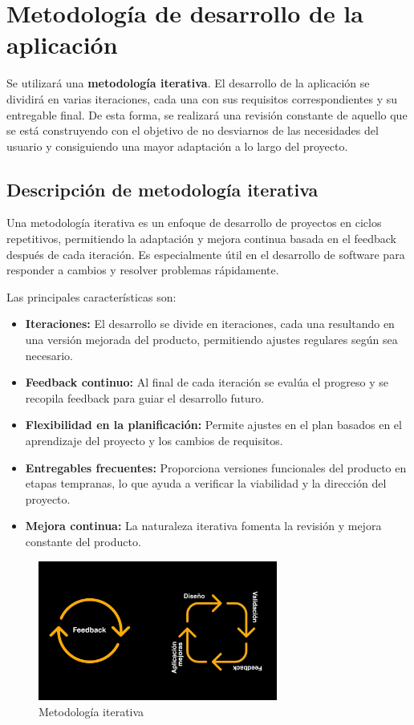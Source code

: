 \section{Metodología de desarrollo de la aplicación}

Se utilizará una \textbf{metodología iterativa}. El desarrollo de la aplicación se dividirá en varias iteraciones, cada una con sus requisitos correspondientes y su entregable final. De esta forma, se realizará una revisión constante de aquello que se está construyendo con el objetivo de no desviarnos de las necesidades del usuario y consiguiendo una mayor adaptación a lo largo del proyecto. 

\subsection{Descripción de metodología iterativa}

Una metodología iterativa es un enfoque de desarrollo de proyectos en ciclos repetitivos, permitiendo la adaptación y mejora continua basada en el feedback después de cada iteración. Es especialmente útil en el desarrollo de software para responder a cambios y resolver problemas rápidamente. \cite{agile}

Las principales características son: 

\begin{itemize}
	\item \textbf{Iteraciones: } El desarrollo se divide en iteraciones, cada una resultando en una versión mejorada del producto, permitiendo ajustes regulares según sea necesario.
	\item \textbf{Feedback continuo: } Al final de cada iteración se evalúa el progreso y se recopila feedback para guiar el desarrollo futuro.
	\item \textbf{Flexibilidad en la planificación: } Permite ajustes en el plan basados en el aprendizaje del proyecto y los cambios de requisitos. 
	\item \textbf{Entregables frecuentes: } Proporciona versiones funcionales del producto en etapas tempranas, lo que ayuda a verificar la viabilidad y la dirección del proyecto. 
	\item \textbf{Mejora continua: } La naturaleza iterativa fomenta la revisión y mejora constante del producto. 
\end{itemize}

\begin{figure}[H]
	\centering
	\includegraphics[width=0.7\textwidth]{imagenes/imagenesTecnologias/iterativa.jpg}
	\caption{Metodología iterativa}
\end{figure}

